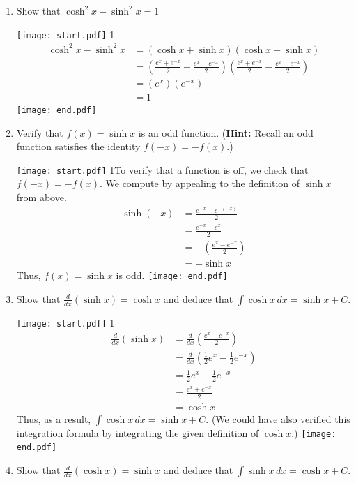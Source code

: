 \documentclass[12pt]{article}
\begin{document}
\begin{enumerate}
\begin{enumerate}

\item Show that $\cosh^2{x}-\sinh^2{x}=1$

\texttt{[image: start.pdf]}
{{{1\linewidth}{
\begin{align*}
\cosh^2{x}-\sinh^{2}{x} & = (\cosh{x}+\sinh{x})(\cosh{x}-\sinh{x})\\
&=\left(\frac{e^x+e^{-x}}{2}+\frac{e^x-e^{-x}}{2}\right)\left(\frac{e^x+e^{-x}}{2}-\frac{e^x-e^{-x}}{2}\right)\\
&=(e^x)(e^{-x})\\
&=1
\end{align*}
}}}
\texttt{[image: end.pdf]}


\item Verify that $f(x)=\sinh{x}$ is an odd function. ({\bf Hint:} Recall an odd function satisfies the identity $f(-x)=-f(x)$.)

\texttt{[image: start.pdf]}
{{{1\linewidth}{To verify that a function is off, we check that $f(-x)=-f(x)$. We compute by appealing to the definition of $\sinh{x}$ from above.
\begin{align*}
\sinh{(-x)}&=\frac{e^{-x}-e^{-(-x)}}{2}\\
&=\frac{e^{-x}-e^{x}}{2}\\
&=-\left(\frac{e^{x}-e^{-x}}{2}\right)\\
&=-\sinh{x}
\end{align*}
Thus, $f(x)=\sinh{x}$ is odd.}}}
\texttt{[image: end.pdf]}


\newpage

\item Show that $\frac{d}{dx}(\sinh{x})=\cosh{x}$ and deduce that $\int \cosh{x}\,dx=\sinh{x}+C$.

\texttt{[image: start.pdf]}
{{{1\linewidth}{
\begin{align*}
\frac{d}{dx}(\sinh{x}) &= \frac{d}{dx}\left(\frac{e^x-e^{-x}}{2}\right)\\
&=\frac{d}{dx}\left(\frac{1}{2}e^x-\frac{1}{2}e^{-x}\right)\\
&=\frac{1}{2}e^x+\frac{1}{2}e^{-x}\\
&=\frac{e^x+e^{-x}}{2}\\
&=\cosh{x}
\end{align*}
Thus, as a result, $\int \cosh{x}\,dx=\sinh{x}+C$.  (We could have also verified this integration formula by integrating the given definition of $\cosh{x}$.)
}}}
\texttt{[image: end.pdf]}


\item Show that $\frac{d}{dx}(\cosh{x})=\sinh{x}$ and deduce that $\int \sinh{x}\,dx=\cosh{x}+C$.


\end{enumerate}
\end{enumerate}
\end{document}

